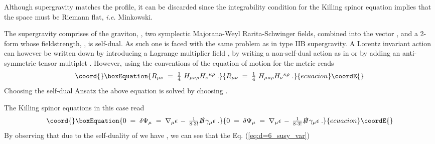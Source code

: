 \documentclass[a4paper,12pt]{article}
\begin{document}
Although \coordHE{}  \coordHE{} supergravity matches the profile, it can be discarded since
the integrability condition for the Killing spinor equation implies that the space must be 
Riemann flat, {\em i.e.} Minkowski.
%
%
\par
The \coordHE{}  \coordHE{} supergravity comprises of the graviton, \coordHE{}, two symplectic Majorana-Weyl Rarita-Schwinger
fields, combined into the \coordHE{} vector \myHighlight{$\Psi_{\mu}$}\coordHE{}, and a 2-form \coordHE{} whose fieldstrength, \coordHE{}, is self-dual. 
As such one is faced with the same problem as
in type IIB supergravity. A Lorentz invariant action can however be written down by introducing
a Lagrange multiplier field \cite{art:KM}, by writing a non-self-dual action as in \cite{art:BHO} or by 
adding an anti-symmetric tensor multiplet \cite{art:MS}. However, using the conventions of \cite{art:NS} 
the equation of motion for the metric reads
\begin{equation}\coord{}\boxEquation{
\label{eq:EOM_d=6_N=2}
  R_{\mu\nu} \;=\; \textstyle{\frac{1}{4}}\ H_{\mu\kappa\rho}H_{\nu}{}^{\kappa\rho} \; .
}{
R_{\mu\nu} \;=\; \textstyle{\frac{1}{4}}\ H_{\mu\kappa\rho}H_{\nu}{}^{\kappa\rho} \; .
}{ecuacion}\coordE{}\end{equation}
Choosing the self-dual Ansatz \coordHE{} the above equation is 
solved by choosing \coordHE{}.
\par
The Killing spinor equations in this case read
\begin{equation}\coord{}\boxEquation{
\label{eq:d=6_susy_var}
 0\;=\; \delta\Psi_{\mu} \;=\; \nabla_{\mu}\epsilon \,-\, 
        \textstyle{\frac{1}{8\cdot 3!}}\slashed{H}\gamma_{\mu}\epsilon \; .
}{
0\;=\; \delta\Psi_{\mu} \;=\; \nabla_{\mu}\epsilon \,-\, 
        \textstyle{\frac{1}{8\cdot 3!}}\slashed{H}\gamma_{\mu}\epsilon \; .
}{ecuacion}\coordE{}\end{equation}
By observing that due to the self-duality of \coordHE{} we have \coordHE{}, we can see that the Eq. (\ref{eq:d=6_susy_var})
\end{document}

